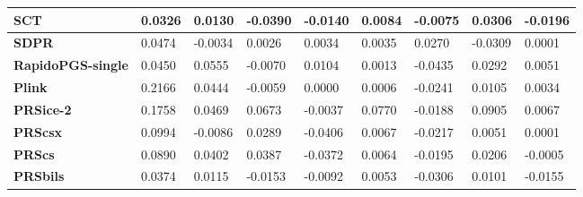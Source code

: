 \documentclass[pdflatex,sn-basic]{sn-jnl}
\begin{document}
\begin{table}[!ht]
{\begin{tabular}{|l|l|l|l|l|l|l|l|l|}
\hline
\textbf{SCT} & \cellcolor[HTML]{FED980}0.0326 & \cellcolor[HTML]{FCC37C}0.0130 & \cellcolor[HTML]{F8696B}-0.0390 & \cellcolor[HTML]{FDCB7E}-0.0140 & \cellcolor[HTML]{FAEA84}0.0084 & \cellcolor[HTML]{D5DF82}-0.0075 & \cellcolor[HTML]{D5DF82}0.0306 & \cellcolor[HTML]{F8696B}-0.0196 \\
\hline
\textbf{SDPR} & \cellcolor[HTML]{FEDF81}0.0474 & \cellcolor[HTML]{FA9D75}-0.0034 & \cellcolor[HTML]{FCB87A}0.0026 & \cellcolor[HTML]{E0E283}0.0034 & \cellcolor[HTML]{FEE983}0.0035 & \cellcolor[HTML]{7EC67D}0.0270 & \cellcolor[HTML]{FA9974}-0.0309 & \cellcolor[HTML]{FEEA83}0.0001 \\
\hline
\textbf{RapidoPGS-single} & \cellcolor[HTML]{FEDE81}0.0450 & \cellcolor[HTML]{7EC67D}0.0555 & \cellcolor[HTML]{FBA676}-0.0070 & \cellcolor[HTML]{C7DB81}0.0104 & \cellcolor[HTML]{FEE883}0.0013 & \cellcolor[HTML]{FCC17B}-0.0435 & \cellcolor[HTML]{D7E082}0.0292 & \cellcolor[HTML]{F3E884}0.0051 \\
\hline
\textbf{Plink} & \cellcolor[HTML]{91CC7E}0.2166 & \cellcolor[HTML]{B8D780}0.0444 & \cellcolor[HTML]{FBA877}-0.0059 & \cellcolor[HTML]{ECE683}0.0000 & \cellcolor[HTML]{FEE883}0.0006 & \cellcolor[HTML]{FEEB84}-0.0241 & \cellcolor[HTML]{FBEA84}0.0105 & \cellcolor[HTML]{F7E984}0.0034 \\
\hline
\textbf{PRSice-2} & \cellcolor[HTML]{B2D580}0.1758 & \cellcolor[HTML]{ABD380}0.0469 & \cellcolor[HTML]{B7D780}0.0673 & \cellcolor[HTML]{F9EA84}-0.0037 & \cellcolor[HTML]{63BE7B}0.0770 & \cellcolor[HTML]{F1E784}-0.0188 & \cellcolor[HTML]{63BE7B}0.0905 & \cellcolor[HTML]{EFE784}0.0067 \\
\hline
\textbf{PRScsx} & \cellcolor[HTML]{EFE784}0.0994 & \cellcolor[HTML]{FA9272}-0.0086 & \cellcolor[HTML]{FFEB84}0.0289 & \cellcolor[HTML]{F8696B}-0.0406 & \cellcolor[HTML]{FEEB84}0.0067 & \cellcolor[HTML]{F8E984}-0.0217 & \cellcolor[HTML]{FEE482}0.0051 & \cellcolor[HTML]{FEEA83}0.0001 \\
\hline
\textbf{PRScs} & \cellcolor[HTML]{F7E984}0.0890 & \cellcolor[HTML]{CEDD82}0.0402 & \cellcolor[HTML]{EDE683}0.0387 & \cellcolor[HTML]{F8756D}-0.0372 & \cellcolor[HTML]{FFEB84}0.0064 & \cellcolor[HTML]{F3E884}-0.0195 & \cellcolor[HTML]{E8E583}0.0206 & \cellcolor[HTML]{FEE683}-0.0005 \\
\hline
\textbf{PRSbils} & \cellcolor[HTML]{FEDB80}0.0374 & \cellcolor[HTML]{FCBF7B}0.0115 & \cellcolor[HTML]{FA9673}-0.0153 & \cellcolor[HTML]{FEDD81}-0.0092 & \cellcolor[HTML]{FEEA83}0.0053 & \cellcolor[HTML]{FEDD81}-0.0306 & \cellcolor[HTML]{FCEA84}0.0101 & \cellcolor[HTML]{F98370}-0.0155 \\

\end{tabular}}
\end{table}
\end{document}
